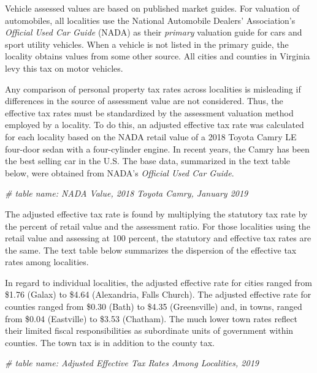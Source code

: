 \documentclass[
]{book}
\newenvironment{Shaded}{\begin{snugshade}}{\end{snugshade}}
\newcommand{\CommentTok}[1]{\textcolor[rgb]{0.56,0.35,0.01}{\textit{#1}}}
\begin{document}
Vehicle assessed values are based on published market guides. For valuation of automobiles, all localities use the National Automobile Dealers' Association's \emph{Official Used Car Guide} (NADA) as their \emph{primary} valuation guide for cars and sport utility vehicles. When a vehicle is not listed in the primary guide, the locality obtains values from some other source. All cities and counties in Virginia levy this tax on motor vehicles.

Any comparison of personal property tax rates across localities is misleading if differences in the source of assessment value are not considered. Thus, the effective tax rates must be standardized by the assessment valuation method employed by a locality. To do this, an adjusted effective tax rate was calculated for each locality based on the NADA retail value of a 2018 Toyota Camry LE four-door sedan with a four-cylinder engine. In recent years, the Camry has been the best selling car in the U.S. The base data, summarized in the text table below, were obtained from NADA's \emph{Official Used Car Guide}.

\begin{Shaded}
\begin{Highlighting}[]
\CommentTok{\# table name: NADA Value, 2018 Toyota Camry, January 2019}
\end{Highlighting}
\end{Shaded}

The adjusted effective tax rate is found by multiplying the statutory tax rate by the percent of retail value and the assessment ratio. For those localities using the retail value and assessing at 100 percent, the statutory and effective tax rates are the same. The text table below summarizes the dispersion of the effective tax rates among localities.

In regard to individual localities, the adjusted effective rate for cities ranged from \$1.76 (Galax) to \$4.64 (Alexandria, Falls Church). The adjusted effective rate for counties ranged from \$0.30 (Bath) to \$4.35 (Greensville) and, in towns, ranged from \$0.04 (Eastville) to \$3.53 (Chatham). The much lower town rates reflect their limited fiscal responsibilities as subordinate units of government within counties. The town tax is in addition to the county tax.

\begin{Shaded}
\begin{Highlighting}[]
\CommentTok{\# table name: Adjusted Effective Tax Rates Among Localities, 2019}
\end{Highlighting}
\end{Shaded}
\end{document}
